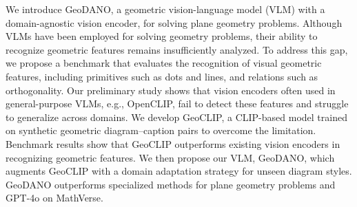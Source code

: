 We introduce GeoDANO, a geometric vision-language model (VLM) with a domain-agnostic vision encoder, for solving plane geometry problems. Although VLMs have been employed for solving geometry problems, their ability to recognize geometric features remains insufficiently analyzed. 
To address this gap, we propose a benchmark that evaluates the recognition of visual geometric features, including primitives such as dots and lines, and relations such as orthogonality.
Our preliminary study shows that vision encoders often used in general-purpose VLMs, e.g., OpenCLIP, fail to detect these features and struggle to generalize across domains. We develop GeoCLIP, a CLIP-based model trained on synthetic geometric diagram–caption pairs to overcome the limitation. Benchmark results show that GeoCLIP outperforms existing vision encoders in recognizing geometric features. We then propose our VLM, GeoDANO, which augments GeoCLIP with a domain adaptation strategy for unseen diagram styles. GeoDANO outperforms specialized methods for plane geometry problems and GPT-4o on MathVerse.